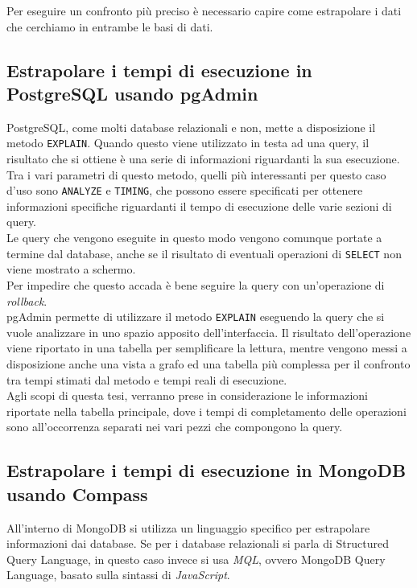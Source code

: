 Per eseguire un confronto più preciso è necessario capire come estrapolare i dati che cerchiamo in entrambe le basi di dati.

\subsection{Estrapolare i tempi di esecuzione in PostgreSQL usando pgAdmin}
PostgreSQL, come molti database relazionali e non, mette a disposizione il metodo \texttt{EXPLAIN}\cite{site:postgresdocs}. Quando questo viene utilizzato in testa ad una query, il risultato che si ottiene è una serie di informazioni riguardanti la sua esecuzione. Tra i vari parametri di questo metodo, quelli più interessanti per questo caso d'uso sono \texttt{ANALYZE} e \texttt{TIMING}, che possono essere specificati per ottenere informazioni specifiche riguardanti il tempo di esecuzione delle varie sezioni di query.\\
Le query che vengono eseguite in questo modo vengono comunque portate a termine dal database, anche se il risultato di eventuali operazioni di \texttt{SELECT} non viene mostrato a schermo.\\
Per impedire che questo accada è bene seguire la query con un'operazione di \textit{rollback}.\\

\noindent pgAdmin permette di utilizzare il metodo \texttt{EXPLAIN} eseguendo la query che si vuole analizzare in uno spazio apposito dell'interfaccia\cite{site:pgAdmin}. Il risultato dell'operazione viene riportato in una tabella per semplificare la lettura, mentre vengono messi a disposizione anche una vista a grafo ed una tabella più complessa per il confronto tra tempi stimati dal metodo e tempi reali di esecuzione.\\
Agli scopi di questa tesi, verranno prese in considerazione le informazioni riportate nella tabella principale, dove i tempi di completamento delle operazioni sono all'occorrenza separati nei vari pezzi che compongono la query.

\subsection{Estrapolare i tempi di esecuzione in MongoDB usando Compass}
All'interno di MongoDB si utilizza un linguaggio specifico per estrapolare informazioni dai database\cite{site:mongodb}. Se per i database relazionali si parla di Structured Query Language, in questo caso invece si usa \textit{MQL}, ovvero MongoDB Query Language, basato sulla sintassi di \textit{JavaScript}.\\

